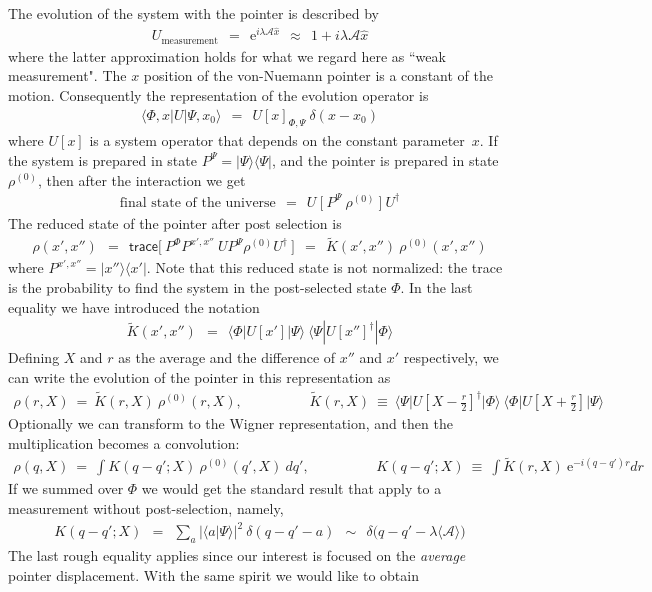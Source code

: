 \documentclass[onecolumn,fleqn]{revtex4}
\newcommand{\trc}{\mathsf{trace}}
\newcommand{\eexp}{\mathrm{e}^}
\newcommand{\tbox}[1]{\text{#1}}
\newcommand{\beq}{\begin{eqnarray}}
\newcommand{\eeq}{\end{eqnarray}}
\begin{document}
The evolution of the system with the pointer is described by 
\beq
U_{\tbox{measurement}} \ \ = \ \ \eexp{i\lambda \mathcal{A} \hat{x}}  
\ \ \approx \ \ 1+i\lambda \mathcal{A} \hat{x}
\eeq
where the latter approximation holds for what we regard here as ``weak measurement".
The $x$ position of the von-Nuemann pointer is 
a constant of the motion. Consequently the representation 
of the evolution operator is  
\beq
\langle \Phi, x|U| \Psi, x_0 \rangle \ \ = \ \ U[x]_{\Phi,\Psi} \ \delta(x-x_0)
\eeq
where $U[x]$ is a system operator that depends 
on the constant parameter~$x$.    
If the system is prepared in state $P^{\Psi} = |\Psi\rangle\langle\Psi|$, 
and the pointer is prepared in state $\rho^{(0)}$, 
then after the interaction we get 
\beq
\mbox{final state of the universe} \ \ = \ \  U \ \Big[ \ P^{\Psi} \ \rho^{(0)} \ \Big] \ U^{\dag}
\eeq
The reduced state of the pointer after post selection is 
\beq
\rho(x',x'') 
\ \ = \ \ \trc\Big[ \ P^{\Phi} P^{x',x''} \  U P^{\Psi} \rho^{(0)} U^{\dag} \  \Big]
\ \ = \ \ \tilde{K}(x',x'') \ \rho^{(0)}(x',x'') 
\eeq
where $P^{x',x''}=|x'' \rangle\langle x'|$.
Note that this reduced state is not normalized: 
the trace is the probability to find the system 
in the post-selected state $\Phi$.
In the last equality we have introduced the notation    
\beq
\tilde{K}(x',x'') \ \ = \ \ \langle \Phi | U[x'] | \Psi \rangle \ \langle \Psi | U[x'']^{\dag} | \Phi \rangle
\eeq
Defining $X$ and $r$ as the average and the difference 
of $x''$ and $x'$ respectively, we can write the evolution 
of the pointer in this representation as 
\beq
\rho(r,X) \ = \ \tilde{K}(r,X) \ \rho^{(0)}(r,X),
\hspace{2cm}
\tilde{K}(r,X) \ \equiv \ \Big\langle \Psi \Big| U\left[X-\frac{r}{2}\right]^{\dag} \Big| \Phi \Big\rangle  
\ \Big\langle \Phi \Big| U\left[X+\frac{r}{2}\right] \Big| \Psi \Big\rangle  
\eeq
Optionally we can transform to the Wigner 
representation, and then the multiplication 
becomes a convolution: 
\beq
\rho(q,X) \ = \  \int K(q{-}q';X) \ \rho^{(0)}(q',X) \ dq',
\hspace{2cm}
K(q{-}q';X) \ \equiv \ \int  \tilde{K}(r,X) \ \eexp{-i(q{-}q')r} dr
\eeq
If we summed over $\Phi$ we would get the standard result 
that apply to a measurement without post-selection, namely, 
\beq
K(q{-}q';X) 
\ \ = \ \ \sum_a |\langle a | \Psi \rangle|^2 \ \delta(q-q'-a) 
\ \ \sim \ \ \delta\Big(q-q'-\lambda \langle \mathcal{A} \rangle \Big)
\eeq
The last rough equality applies since our interest 
is focused on the {\em average} pointer displacement.    
With the same spirit we would like to obtain 
\end{document}
